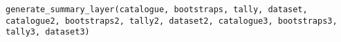 \documentclass[a4paper]{book}
\begin{document}
%
\begin{Usage}
\begin{verbatim}
generate_summary_layer(catalogue, bootstraps, tally, dataset, catalogue2, bootstraps2, tally2, dataset2, catalogue3, bootstraps3, tally3, dataset3)
\end{verbatim}
\end{Usage}
%
\begin{Arguments}
\begin{ldescription}
\item[\code{catalogue}] 

\item[\code{bootstraps}] 

\item[\code{tally}] 

\item[\code{dataset}] 

\item[\code{catalogue2}] 

\item[\code{bootstraps2}] 

\item[\code{tally2}] 

\item[\code{dataset2}] 

\item[\code{catalogue3}] 

\item[\code{bootstraps3}] 

\item[\code{tally3}] 

\item[\code{dataset3}] 

\end{ldescription}
\end{Arguments}
%
\end{document}
